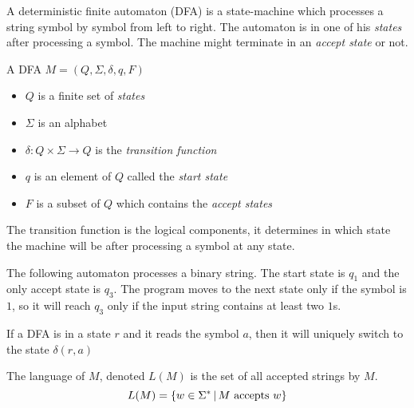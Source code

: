 \documentclass{article}
\begin{document}
A deterministic finite automaton (DFA) is a state-machine which processes a string
symbol by symbol from left to right. The automaton is in one of his \textit{states}
after processing a symbol. The machine might terminate in an
\textit{accept state} or not.

A DFA \(M=(Q, \Sigma, \delta, q, F)\)
\begin{itemize}
    \item \(Q\) is a finite set of \textit{states}
    \item \(\Sigma\) is an alphabet
    \item \(\delta : Q \times \Sigma \to Q\) is the \textit{transition function}
    \item \(q\) is an element of \(Q\) called the \textit{start state}
    \item \(F\) is a subset of \(Q\) which contains the \textit{accept states}
\end{itemize}
The transition function is the logical components, it determines
in which state the machine will be after processing a symbol at any state.

The following automaton processes a binary string.
The start state is \(q_1\) and the only accept state is \(q_3\).
The program moves to the next state only if the symbol is \(1\),
so it will reach \(q_3\) only if the input string contains at least two \(1\)s.
\begin{center}
\end{center}


If a DFA is in a state \(r\) and it reads the symbol \(a\),
then it will uniquely switch to the state \(\delta(r, a)\)

\pagebreak

The language of \(M\), denoted \(L(M)\) is the set of all accepted strings
by \(M\).
\[
    L(M) = \{w \in \Sigma^* \,|\, M\text{ accepts }w\}
\]
\end{document}
